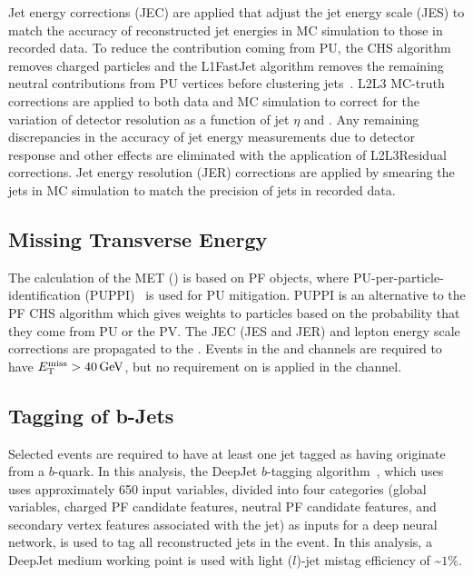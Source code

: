 Jet energy corrections (JEC) are applied that adjust the jet energy scale (JES) to match the accuracy of reconstructed jet energies in MC simulation to those in recorded data.
To reduce the contribution coming from PU, the CHS algorithm removes charged particles and the L1FastJet algorithm removes the remaining neutral contributions from PU vertices before clustering jets~\cite{bib:JME18001}.
L2L3 MC-truth corrections are applied to both data and MC simulation to correct for the variation of detector resolution as a function of jet $\eta$ and \pT.
Any remaining discrepancies in the accuracy of jet energy measurements due to detector response and other effects are eliminated with the application of L2L3Residual corrections.
Jet energy resolution (JER) corrections are applied by smearing the jets in MC simulation to match the precision of jets in recorded data.

\subsection{Missing Transverse Energy}
The calculation of the MET (\ETmiss) is based on PF objects, where PU-per-particle-identification (PUPPI)~\cite{bib:PUPPI} is used for PU mitigation.
PUPPI is an alternative to the PF CHS algorithm which gives weights to particles based on the probability that they come from PU or the PV.
The JEC (JES and JER) and lepton energy scale corrections are propagated to the \ETmiss.
Events in the \mumu and \ee channels are required to have $\ETmiss > \SI{40}{\GeV}$, but no requirement on \ETmiss is applied in the \emu channel.

\subsection{Tagging of b-Jets}
Selected events are required to have at least one jet tagged as having originate from a $b$-quark.
In this analysis, the DeepJet $b$-tagging algorithm~\cite{bib:Bols_2020}, which uses uses approximately 650 input variables, divided into four categories (global variables, charged PF candidate features, neutral PF candidate features, and secondary vertex features associated with the jet) as inputs for a deep neural network, is used to tag all reconstructed jets in the event.
In this analysis, a DeepJet medium working point is used with light ($l$)-jet mistag efficiency of \sim$1\%$.

